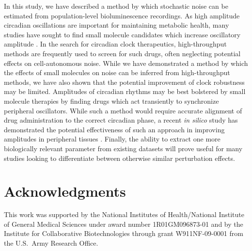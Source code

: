 \documentclass[11pt, letterpaper]{article}
\newcommand{\beginsupplement}{%
        \clearpage
        \setcounter{table}{0}
        \renewcommand{\thetable}{S\arabic{table}}%
        \setcounter{figure}{0}
        \renewcommand{\thefigure}{S\arabic{figure}}%
     }
\begin{document}
In this study, we have described a method by which stochastic noise can be estimated from population-level bioluminescence recordings.
As high amplitude circadian oscillations are important for maintaining metabolic health, many studies have sought to find small molecule candidates which increase oscillatory amplitude \cite{Chen2013}.
In the search for circadian clock therapeutics, high-throughput methods are frequently used to screen for such drugs, often neglecting potential effects on cell-autonomous noise.
While we have demonstrated a method by which the effects of small molecules on noise can be inferred from high-throughput methods, we have also shown that the potential improvement of clock robustness may be limited.
Amplitudes of circadian rhythms may be best bolstered by small molecule therapies by finding drugs which act transiently to synchronize peripheral oscillators.
While such a method would require accurate alignment of drug administration to the correct circadian phase, a recent {\itshape in silico} study has demonstrated the potential effectiveness of such an approach in improving amplitudes in peripheral tissues \cite{St.John2014a}.
Finally, the ability to extract one more biologically relevant parameter from existing datasets will prove useful for many studies looking to differentiate between otherwise similar perturbation effects.



\section*{Acknowledgments}
This work was supported by the National Institutes of Health/National Institute of General Medical Sciences under award number 1R01GM096873-01 and by the Institute for Collaborative Biotechnologies through grant W911NF-09-0001 from the U.S.\ Army Research Office.





\beginsupplement
\end{document}
